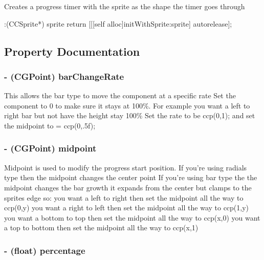 Creates a progress timer with the sprite as the shape the timer goes through 
\begin{DoxyCode}
                       :(CCSprite*) sprite
{
        return [[[self alloc]initWithSprite:sprite] autorelease];
}
\end{DoxyCode}


\subsection{Property Documentation}
\hypertarget{interface_c_c_progress_timer_a9244a39378508fe0da6436e7db1c3724}{
\subsubsection[{bar\-Change\-Rate}]{\setlength{\rightskip}{0pt plus 5cm}-\/ (C\-G\-Point) {\bf bar\-Change\-Rate}}}\label{interface_c_c_progress_timer_a9244a39378508fe0da6436e7db1c3724}
This allows the bar type to move the component at a specific rate Set the component to 0 to make sure it stays at 100\%. For example you want a left to right bar but not have the height stay 100\% Set the rate to be ccp(0,1); and set the midpoint to = ccp(0,.5f); \hypertarget{interface_c_c_progress_timer_a6facf6a6a03270ccadf8d293f9c59011}{
\subsubsection[{midpoint}]{\setlength{\rightskip}{0pt plus 5cm}-\/ (C\-G\-Point) {\bf midpoint}}}\label{interface_c_c_progress_timer_a6facf6a6a03270ccadf8d293f9c59011}
Midpoint is used to modify the progress start position. If you're using radials type then the midpoint changes the center point If you're using bar type the the midpoint changes the bar growth it expands from the center but clamps to the sprites edge so\-: you want a left to right then set the midpoint all the way to ccp(0,y) you want a right to left then set the midpoint all the way to ccp(1,y) you want a bottom to top then set the midpoint all the way to ccp(x,0) you want a top to bottom then set the midpoint all the way to ccp(x,1) \hypertarget{interface_c_c_progress_timer_abf89de0813b2ec610b608ae2b1705667}{
\subsubsection[{percentage}]{\setlength{\rightskip}{0pt plus 5cm}-\/ (float) {\bf percentage}}}\label{interface_c_c_progress_timer_abf89de0813b2ec610b608ae2b1705667}
